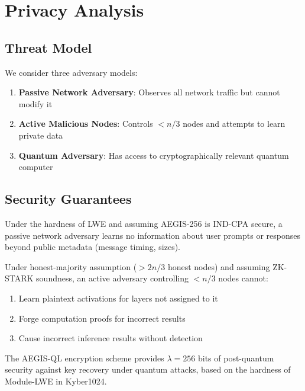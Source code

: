 \documentclass[11pt,a4paper]{article}
\begin{document}
\newpage
\section{Privacy Analysis}

\subsection{Threat Model}

We consider three adversary models:

\begin{enumerate}
    \item \textbf{Passive Network Adversary}: Observes all network traffic but cannot modify it
    \item \textbf{Active Malicious Nodes}: Controls $<n/3$ nodes and attempts to learn private data
    \item \textbf{Quantum Adversary}: Has access to cryptographically relevant quantum computer
\end{enumerate}

\subsection{Security Guarantees}

\begin{theorem}
Under the hardness of LWE and assuming AEGIS-256 is IND-CPA secure, a passive network adversary learns no information about user prompts or responses beyond public metadata (message timing, sizes).
\end{theorem}

\begin{theorem}
Under honest-majority assumption ($>2n/3$ honest nodes) and assuming ZK-STARK soundness, an active adversary controlling $<n/3$ nodes cannot:
\begin{enumerate}
    \item Learn plaintext activations for layers not assigned to it
    \item Forge computation proofs for incorrect results
    \item Cause incorrect inference results without detection
\end{enumerate}
\end{theorem}

\begin{theorem}
The AEGIS-QL encryption scheme provides $\lambda = 256$ bits of post-quantum security against key recovery under quantum attacks, based on the hardness of Module-LWE in Kyber1024.
\end{theorem}
\end{document}

